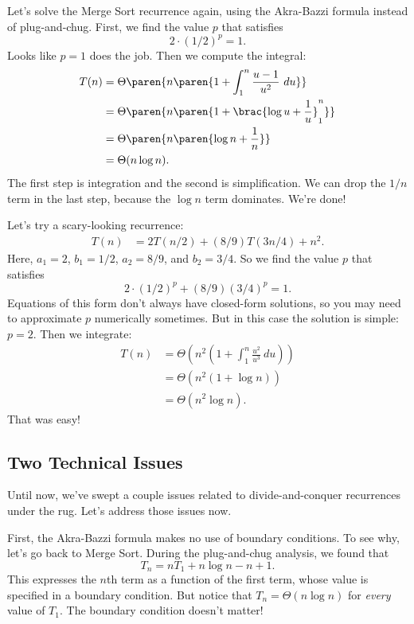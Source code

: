 Let's solve the Merge Sort recurrence again, using the Akra-Bazzi
formula instead of plug-and-chug.  First, we find the value $p$
that satisfies
\[
   2 \cdot (1/2)^p = 1.
\]
Looks like $p = 1$ does the job.  Then we compute the integral:
\begin{align*}
T(n) & = \Theta\paren{n \paren{1 + \int_1^n \frac{u - 1}{u^2}\ du}} \\
  & = \Theta\paren{n \paren{1 + \brac{\log u + \frac{1}{u}}_1^n}}\\
  & = \Theta\paren{n \paren{\log n + \frac{1}{n}}}\\
  & = \Theta(n \log n).
\end{align*}
The first step is integration and the second is simplification.  We
can drop the $1/n$ term in the last step, because the $\log n$ term
dominates.  We're done!

Let's try a scary-looking recurrence:
\begin{align*}
   T(n) & = 2T(n/2) + (8/9)T(3n/4) + n^2.
\end{align*}
Here, $a_1 = 2$, $b_1 = 1/2$, $a_2 = 8/9$, and $b_2 = 3/4$.  So we
find the value $p$ that satisfies
\[
   2 \cdot (1/2)^p + (8/9) (3/4)^p = 1.
\]
Equations of this form don't always have closed-form solutions, so you
may need to approximate $p$ numerically sometimes.  But in this case
the solution is simple: $p = 2$.  Then we integrate:
\begin{align*}
T(n) & = \Theta\left(
n^2 \left(1 + \int_1^n \frac{u^2}{u^3}\ du \right) \right) \\
  & = \Theta\left(
n^2 (1 + \log n) \right) \\
  & = \Theta\left(n^2 \log n\right).
\end{align*}
That was easy!

\subsection{Two Technical Issues}

Until now, we've swept a couple issues related to divide-and-conquer
recurrences under the rug.  Let's address those issues now.

First, the Akra-Bazzi formula makes no use of boundary conditions.  To
see why, let's go back to Merge Sort.  During the plug-and-chug
analysis, we found that
\[
   T_n = n T_1 + n \log n - n + 1.
\]
This expresses the $n$th term as a function of the first term, whose
value is specified in a boundary condition.  But notice that $T_n =
\Theta(n \log n)$ for \emph{every} value of $T_1$.  The boundary
condition doesn't matter!

